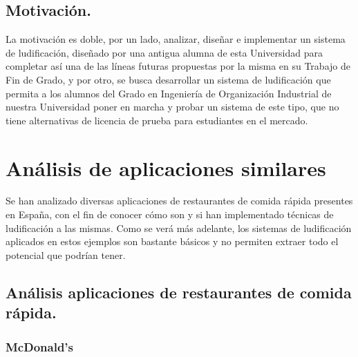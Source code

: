 \documentclass[twoside]{report}
\begin{document}
\subsection{Motivación.}

La motivación es doble, por un lado, analizar, diseñar e implementar un sistema de ludificación, diseñado por una antigua alumna de esta Universidad para completar así una de las líneas futuras propuestas por la misma en su Trabajo de Fin de Grado, y por otro, se busca desarrollar un sistema de ludificación que permita a los alumnos del Grado en Ingeniería de Organización Industrial de nuestra Universidad poner en marcha y probar un sistema de este tipo, que no tiene alternativas de licencia de prueba para estudiantes en el mercado.

\section{Análisis de aplicaciones similares}

Se han analizado diversas aplicaciones de restaurantes de comida rápida presentes en España, con el fin de conocer cómo son y si han implementado técnicas de ludificación a las mismas. Como se verá más adelante, los sistemas de ludificación aplicados en estos ejemplos son bastante básicos y no permiten extraer todo el potencial que podrían tener.

\subsection{Análisis aplicaciones de restaurantes de comida rápida.}
\subsubsection{McDonald's}
\end{document}
